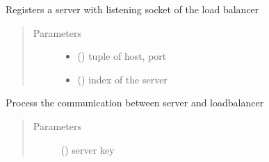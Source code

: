 \documentclass[letterpaper,10pt,english]{sphinxmanual}
\begin{document}

\begin{fulllineitems}
\label{\detokenize{loadbalancer:loadbalancer.registerServer}}
Registers a server with listening socket of the load balancer
\begin{quote}\begin{description}
\item[{Parameters}] \leavevmode\begin{itemize}
\item {} 
 (\sphinxstyleliteralemphasis{\sphinxupquote{{[}}}\sphinxstyleliteralemphasis{\sphinxupquote{, }}\sphinxstyleliteralemphasis{\sphinxupquote{{]}}}) \textendash{} tuple of host, port

\item {} 
 () \textendash{} index of the server

\end{itemize}

\end{description}\end{quote}

\end{fulllineitems}


\begin{fulllineitems}
\label{\detokenize{loadbalancer:loadbalancer.serverComm}}
Process the communication between server and loadbalancer
\begin{quote}\begin{description}
\item[{Parameters}] \leavevmode
{} () \textendash{} server key

\end{description}\end{quote}

\end{fulllineitems}
\end{document}
